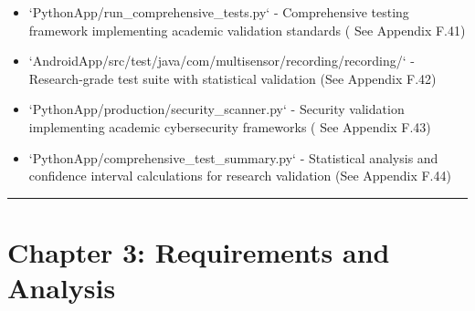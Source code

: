 \documentclass[12pt,a4paper]{report}
\begin{document}
\begin{itemize}
\item `PythonApp/run_comprehensive_tests.py` - Comprehensive testing framework implementing academic validation standards (
  See Appendix F.41)
\item `AndroidApp/src/test/java/com/multisensor/recording/recording/` - Research-grade test suite with statistical
  validation (See Appendix F.42)
\item `PythonApp/production/security_scanner.py` - Security validation implementing academic cybersecurity frameworks (
  See Appendix F.43)
\item `PythonApp/comprehensive_test_summary.py` - Statistical analysis and confidence interval calculations for research
  validation (See Appendix F.44)

\end{itemize}
\hrule

\section{Chapter 3: Requirements and Analysis}
\end{document}
